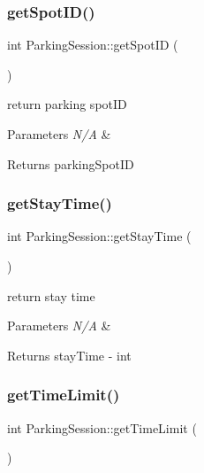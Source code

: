 \subsubsection{\texorpdfstring{get\+Spot\+I\+D()}{getSpotID()}}
{\footnotesize\ttfamily int Parking\+Session\+::get\+Spot\+ID (\begin{DoxyParamCaption}{ }\end{DoxyParamCaption})}



return parking spot\+ID 


\begin{DoxyParams}{Parameters}
{\em N/A} & \\
\hline
\end{DoxyParams}
\begin{DoxyReturn}{Returns}
parking\+Spot\+ID 
\end{DoxyReturn}
\mbox{\label{class_parking_session_a87514c461ced20ad263e808ad231eb1a}} 
\subsubsection{\texorpdfstring{get\+Stay\+Time()}{getStayTime()}}
{\footnotesize\ttfamily int Parking\+Session\+::get\+Stay\+Time (\begin{DoxyParamCaption}{ }\end{DoxyParamCaption})}



return stay time 


\begin{DoxyParams}{Parameters}
{\em N/A} & \\
\hline
\end{DoxyParams}
\begin{DoxyReturn}{Returns}
stay\+Time -\/ int 
\end{DoxyReturn}
\mbox{\label{class_parking_session_a661ba75f949f9a5d594f5d08a3ccb619}} 
\subsubsection{\texorpdfstring{get\+Time\+Limit()}{getTimeLimit()}}
{\footnotesize\ttfamily int Parking\+Session\+::get\+Time\+Limit (\begin{DoxyParamCaption}{ }\end{DoxyParamCaption})}



